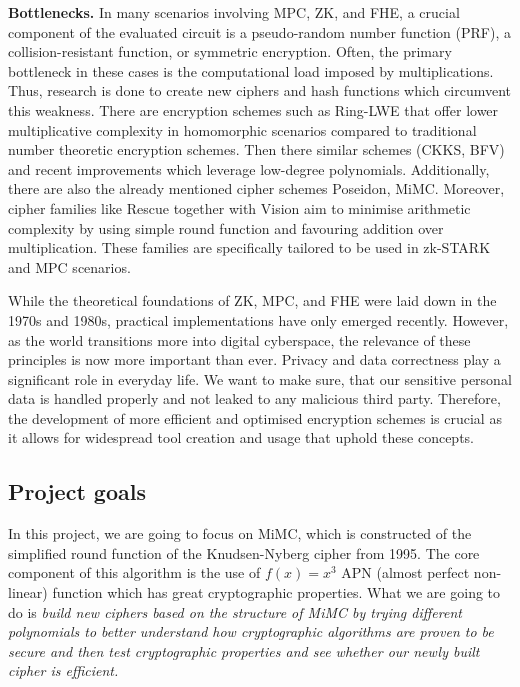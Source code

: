 \documentclass{Resources/UoBLab1}
\theoremstyle{definition}
\begin{document}
\noindent\textbf{Bottlenecks.} In many scenarios involving MPC, ZK, and FHE, a crucial component of the evaluated circuit is a pseudo-random number function (PRF), a collision-resistant function, or symmetric encryption. Often, the primary bottleneck in these cases is the computational load imposed by multiplications. Thus, research is done to create new ciphers and hash functions which circumvent this weakness. There are encryption schemes such as Ring-LWE\cite{RINGLWE} that offer lower multiplicative complexity in homomorphic scenarios compared to traditional number theoretic encryption schemes. Then there similar schemes (CKKS\cite{CKKS}, BFV\cite{BFV1}\cite{BFV2}) and recent improvements\cite{BFVImprov} which leverage low-degree polynomials. Additionally, there are also the already mentioned cipher schemes Poseidon\cite{Poseidon}, MiMC\cite{MiMC}. Moreover, cipher families like Rescue together with Vision\cite{Rescue} aim to minimise arithmetic complexity by using simple round function and favouring addition over multiplication. These families are specifically tailored to be used in zk-STARK and MPC scenarios.

While the theoretical foundations of ZK, MPC, and FHE were laid down in the 1970s and 1980s, practical implementations have only emerged recently. However, as the world transitions more into digital cyberspace, the relevance of these principles is now more important than ever. Privacy and data correctness play a significant role in everyday life. We want to make sure, that our sensitive personal data is handled properly and not leaked to any malicious third party. Therefore, the development of more efficient and optimised encryption schemes is crucial as it allows for widespread tool creation and usage that uphold these concepts.

\subsection{Project goals}\label{sub:goals}
In this project, we are going to focus on MiMC, which is constructed of the simplified round function of the Knudsen-Nyberg cipher from 1995\cite{KNCipher}. The core component of this algorithm is the use of \(f(x)=x^3\) APN (almost perfect non-linear) function which has great cryptographic properties\cite{APN}. What we are going to do is \textit{build new ciphers based on the structure of MiMC by trying different polynomials to better understand how cryptographic algorithms are proven to be secure and then test cryptographic properties and see whether our newly built cipher is efficient.}
\end{document}
